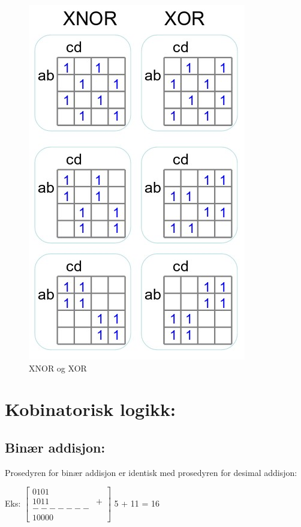 \documentclass{article}
\begin{document}
	\begin{figure}[H]
		\includegraphics[scale = 0.7]{X.jpg}
		\caption{XNOR og XOR}
	\end{figure}
	
	
	\section*{Kobinatorisk logikk:}
	
	\subsection*{Binær addisjon:}
	 Prosedyren for binær addisjon er identisk med prosedyren for desimal addisjon:
	 
	 Eks: 
	 $\begin{bmatrix}
	 0 1 0 1 \\
	 1 0 1 1 & + \\
	 ------- \\
	 1 0 0 0 0
	 \end{bmatrix}$
	5 + 11 = 16
\end{document}
